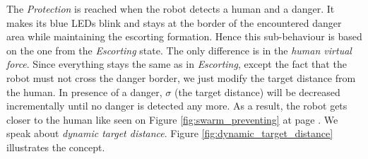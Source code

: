 \documentclass[oneside, a4paper, 12pt]{memoir}
\begin{document}
			The \emph{Protection} is reached when the robot detects a human and a danger. It makes its blue LEDs blink and stays at the border of the encountered danger area while maintaining the escorting formation. Hence this sub-behaviour is based on the one from the \emph{Escorting} state. The only difference is in the \emph{human virtual force}. Since everything stays the same as in \emph{Escorting}, except the fact that the robot must not cross the danger border, we just modify the target distance from the human. In presence of a danger, $\sigma$ (the target distance) will be decreased incrementally until no danger is detected any more. As a result, the robot gets closer to the human like seen on Figure \ref{fig:swarm_preventing} at page \pageref{fig:swarm_preventing}. We speak about \emph{dynamic target distance}. Figure \ref{fig:dynamic_target_distance} illustrates the concept. %
			
\end{document}
